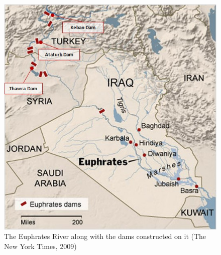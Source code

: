 \documentclass[letterpaper,12pt,titlepage,oneside,final]{book}
\begin{document}
\begin{center}
\begin{figure}[h]
\centering
\includegraphics[scale=.6]{PDF-IMG/dams.jpg}

\caption{The Euphrates River along with the dams constructed on it (The New York Times, 2009)}

\label{fig:dams}
\end{figure}
\end{center}
\end{document}

